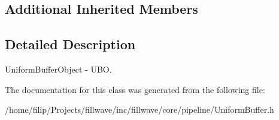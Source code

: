 \subsection*{Additional Inherited Members}


\subsection{Detailed Description}
Uniform\+Buffer\+Object -\/ U\+B\+O. 

The documentation for this class was generated from the following file\+:\begin{DoxyCompactItemize}
\item 
/home/filip/\+Projects/fillwave/inc/fillwave/core/pipeline/Uniform\+Buffer.\+h\end{DoxyCompactItemize}
